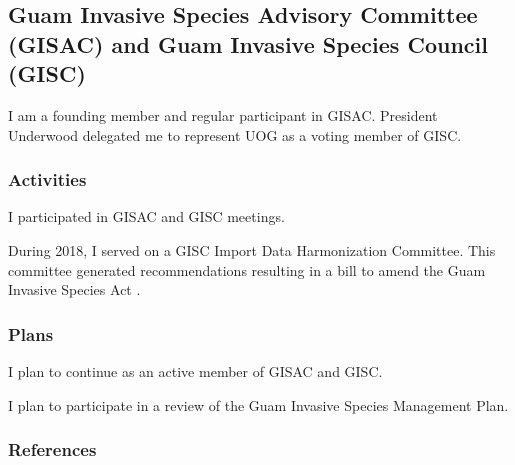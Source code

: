 \subsection{Guam Invasive Species Advisory Committee (GISAC) and Guam Invasive Species Council (GISC)}
\begin{refsection}
	
I am a founding member and regular participant in GISAC. President Underwood delegated me to represent UOG as a voting member of GISC.

\subsubsection{Activities}

I participated in GISAC and GISC meetings.

During 2018, I served on a GISC Import Data Harmonization Committee.
This committee generated recommendations \cite{guerrero_guam_2018}
resulting in a bill to amend the Guam Invasive Species Act \cite{guerrero_bill_2018}.

\subsubsection{Plans}

I plan to continue as an active member of GISAC and GISC.

I plan to participate in a review of the Guam Invasive Species Management Plan.

\subsubsection{References}
\printbibliography[heading=none]
\end{refsection}

